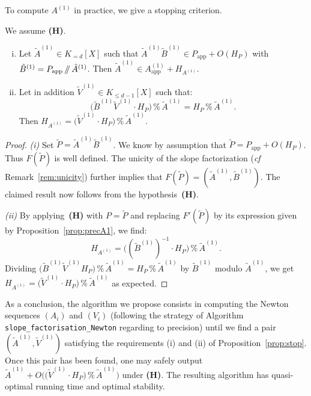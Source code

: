 \documentclass{sig-alternate-05-2015}
\renewcommand{\mod}{\,\%\,}
\renewcommand{\div}{\,/\hspace{-0.3em}/\,}
\newcommand{\app}{\textrm{app}}
\begin{document}
To compute $A^{(1)}$ in practice, we give a stopping criterion.

\begin{prop}
\label{prop:stop}
We assume \textbf{(H)}. 

\vspace{-1mm}

\begin{enumerate}[(i)]
\item Let $\tilde A^{(1)} \in K_{=d}[X]$ such that
$\tilde A^{(1)} \tilde B^{(1)} \in P_\app + O(H_P)$ with
$\tilde B^{(1)} = P_\app \div \tilde A^{(1)}$.
Then $\tilde A^{(1)} \in A_\app^{(1)} + H_{A^{(1)}}$.
\vspace{-1mm}
\item Let in addition $\tilde V^{(1)} \in K_{\leq d{-}1}[X]$ such that:
$$\big(\tilde B^{(1)} \tilde V^{(1)} \cdot H_P\big) \mod \tilde A^{(1)}
= H_P \mod \tilde A^{(1)}.$$
Then $H_{A^{(1)}} = \big(\tilde V^{(1)} \cdot H_P\big) \mod \tilde A^{(1)}$.
\end{enumerate}
\end{prop}

\begin{proof}
\emph{(i)} 
Set $\tilde P = \tilde A^{(1)} \tilde B^{(1)}$. We know by assumption
that $\tilde P = P_\app + O(H_P)$. Thus $F(\tilde P)$ is well defined.
The unicity of the slope factorization (\emph{cf} 
Remark~\ref{rem:unicity}) further implies that $F(\tilde P) = 
(\tilde A^{(1)}, \tilde B^{(1)})$. The claimed result now follows from
the hypothesis~\textbf{(H)}.

\emph{(ii)} By applying~\textbf{(H)} with $P = \tilde P$ and replacing 
$F'(\tilde P)$ by its expression given by Proposition~\ref{prop:precA1}, 
we find:
$$H_{A^{(1)}} = \big((\tilde B^{(1)})^{-1} \cdot H_P\big) \mod \tilde A^{(1)}.$$
Dividing $\big(\tilde B^{(1)} \tilde V^{(1)} H_P\big) \mod \tilde 
A^{(1)} = H_P \mod \tilde A^{(1)}$ by $\tilde B^{(1)}$ modulo $\tilde
A^{(1)}$, we get
$H_{A^{(1)}} = \big(\tilde V^{(1)} \cdot H_P\big) \mod \tilde A^{(1)}$
as expected.
\end{proof}

As a conclusion, the algorithm we propose consists in computing the 
Newton sequences $(A_i)$ and $(V_i)$ (following the strategy of
Algorithm \texttt{slope\_factorisation\_Newton} regarding to precision)
until we find a pair $(\tilde A^{(1)}, \tilde V^{(1)})$ satisfying 
the requirements (i) and (ii) of Proposition~\ref{prop:stop}. Once this 
pair has been found, one may safely output $\tilde A^{(1)} + 
O\big(\big(\tilde V^{(1)} \cdot H_P\big) \mod \tilde A^{(1)}\big)$ under
\textbf{(H)}.
The resulting algorithm has quasi-optimal running 
time and optimal stability.
\end{document}
